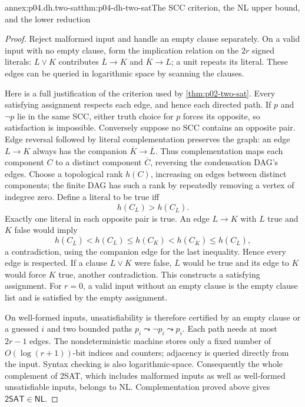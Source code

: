 \begin{annexitem}{annex:p04.dh.two-sat}{thm:p04-dh-two-sat}{The SCC criterion, the NL upper bound, and the lower reduction}
\begin{proof}
Reject malformed input and handle an empty clause separately. On a valid
input with no empty clause, form the implication relation on the \(2r\)
signed literals: \(L\lor K\) contributes
\(\overline L\to K\) and \(\overline K\to L\); a unit repeats its literal.
These edges can be queried in logarithmic space by scanning the clauses.

Here is a full justification of the criterion used by
\cref{thm:p02-two-sat}. Every satisfying assignment respects each edge,
and hence each directed path. If \(p\) and \(\neg p\) lie in the same
SCC, either truth choice for \(p\) forces its opposite, so satisfaction
is impossible. Conversely suppose no SCC contains an opposite pair.
Edge reversal followed by literal complementation preserves the graph:
an edge \(L\to K\) always has the companion
\(\overline K\to\overline L\). Thus complementation maps each component
\(C\) to a distinct component \(\overline C\), reversing the condensation
DAG's edges. Choose a topological rank \(h(C)\), increasing on edges
between distinct components; the finite DAG has such a rank by repeatedly
removing a vertex of indegree zero. Define a literal to be true iff
\[
 h(C_L)>h(C_{\overline L}).
\]
Exactly one literal in each opposite pair is true. An edge \(L\to K\)
with \(L\) true and \(K\) false would imply
\[
 h(C_{\overline L})<h(C_L)\leq h(C_K)
 <h(C_{\overline K})\leq h(C_{\overline L}),
\]
a contradiction, using the companion edge for the last inequality.
Hence every edge is respected. If a clause \(L\lor K\) were false,
\(\overline L\) would be true and its edge to \(K\) would force \(K\)
true, another contradiction. This constructs a satisfying assignment.
For \(r=0\), a valid input without an empty clause is the empty clause
list and is satisfied by the empty assignment.

On well-formed inputs, unsatisfiability is therefore certified by an
empty clause or a guessed \(i\) and two bounded paths
\(p_i\leadsto\neg p_i\leadsto p_i\). Each path needs at most \(2r-1\)
edges. The nondeterministic machine stores only a fixed number of
\(O(\log(r+1))\)-bit indices and counters; adjacency is queried directly
from the input. Syntax checking is also logarithmic-space. Consequently
the whole complement of 2SAT, which includes malformed inputs as well
as well-formed unsatisfiable inputs, belongs to NL. Complementation
proved above gives \(\mathsf{2SAT}\in\mathsf{NL}\).


\end{proof}
\end{annexitem}
